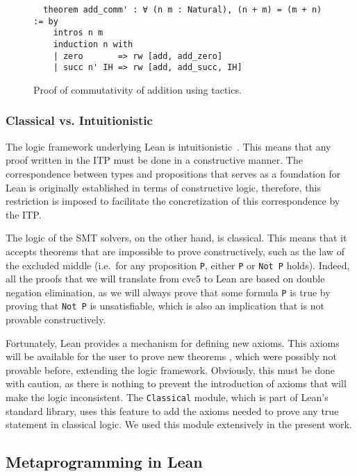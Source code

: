\begin{figure}[t]
\begin{verbatim}
  theorem add_comm' : ∀ (n m : Natural), (n + m) = (m + n) := by
    intros n m
    induction n with
    | zero       => rw [add, add_zero]
    | succ n' IH => rw [add, add_succ, IH]
\end{verbatim}
 \caption{Proof of commutativity of addition using tactics.}\label{addComm2}
\end{figure}


\subsubsection{Classical vs. Intuitionistic}

The logic framework underlying Lean is intuitionistic~\cite{intuitionistic}. This means that any proof written in the ITP
must be done in a constructive manner. The correspondence between types and propositions that serves as a foundation for Lean
is originally established in terms of constructive logic, therefore, this restriction is imposed to facilitate the concretization
of this correspondence by the ITP.\

The logic of the SMT solvers, on the other hand, is classical. This means that it accepts theorems that are impossible to prove
constructively, such as the law of the excluded middle (i.e.\ for any proposition \texttt{P}, either \texttt{P} or \texttt{Not P}
holds). Indeed, all the proofs that we will translate from cvc5 to Lean are based on double negation elimination, as we will
always prove that some formula \texttt{P} is true by proving that \texttt{Not P} is unsatisfiable, which is also an implication
that is not provable constructively.

Fortunately, Lean provides a mechanism for defining new axioms. This axioms will be available for the user to prove new theorems
, which were possibly not provable before, extending the logic framework. Obviously, this must be done with caution, as
there is nothing to prevent the introduction of axioms that will make the logic inconsistent.
The \texttt{Classical} module, which is part of Lean's standard library, uses this feature to add the axioms needed to prove
any true statement in classical logic. We used this module extensively in the present work.

\subsection{Metaprogramming in Lean}\label{sec:metaLean}

